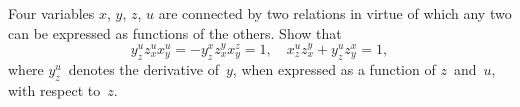 Four variables $x$, $y$, $z$, $u$ are connected by two relations in virtue of
which any two can be expressed as functions of the others. Show that
\[
y_{z}^{u}z_{x}^{u}x_{y}^{u} = -y_{z}^{x}z_{x}^{y}x_{y}^{z} = 1,\quad
x_{z}^{u}z_{x}^{y} + y_{z}^{u}z_{y}^{x} = 1,
\]
where $y_{z}^{u}$~denotes the derivative of~$y$, when expressed as a function of $z$~and~$u$,
with respect to~$z$. 

